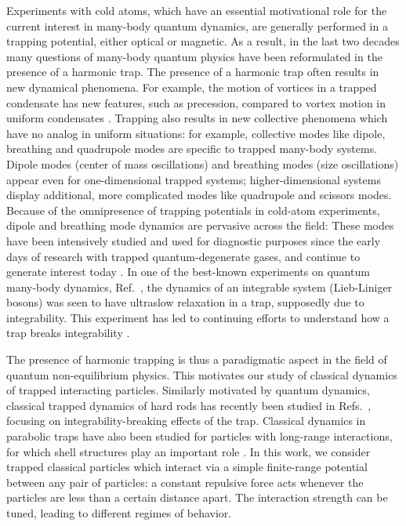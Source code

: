 \documentclass[a4paper, onecolumn]{revtex4-1}
\begin{document}
Experiments with cold atoms, which have an essential motivational role for the current interest in
many-body quantum dynamics, are generally performed in a trapping potential, either optical or
magnetic.  As a result, in the last two decades many questions of many-body quantum physics have
been reformulated in the presence of a harmonic trap.  The presence of a harmonic trap often results
in new dynamical phenomena.  For example, the motion of vortices in a trapped condensate
\cite{vortices_trappedBEC} has new features, such as precession, compared to vortex motion in
uniform condensates \cite{vortices_uniformBEC}.  Trapping also results in new collective phenomena
which have no analog in uniform situations: for example, collective modes like dipole, breathing and
quadrupole modes are specific to trapped many-body systems.  Dipole modes (center of mass
oscillations) and breathing modes (size oscillations) appear even for one-dimensional trapped
systems; higher-dimensional systems display additional, more complicated modes like quadrupole and
scissors modes.  Because of the omnipresence of trapping potentials in cold-atom experiments, dipole
and breathing mode dynamics are pervasive across the field: These modes have been intensively
studied and used for diagnostic purposes since the early days of research with trapped
quantum-degenerate gases, and continue to generate interest today
\cite{collective_modes_early_papers, PitaevskiiRosch_PRA97, Esslinger_exp_PRL2003, STG_Astrakharchik_PRL2005, 
  GrimmSmith_unitaryfermions_PRA08, OrignacCitro_PRA08, Naegerl_Science09, Wetterich_JPB2011, Mazets_1Dbreathing_EPJD11,
  fermion2Dbreathing, Tschischik_BHbreathing_PRA_2013, KroenkeSchmelcher_BM, Bouchoule_PRL2014,
  br_mode_long_range_interactions, Bonitz_Review, QuinnHaque_PRA14, Tschischik_BH_2papers,
   1D_breathing_mode_recent, Minguzzi_dipole_PRA2015, 
  Stringari_lowDcollective_PRA15,    MistakidisSchmelcher_PRA17}. 
%
In one of the best-known experiments on quantum many-body dynamics,
Ref.~\cite{NewtonsCradle_Nature06}, the dynamics of an integrable system (Lieb-Liniger bosons) was
seen to have ultraslow relaxation in a trap, supposedly due to integrability.  This experiment has
led to continuing efforts to understand how a trap breaks integrability
\cite{CauxKonik_glimmers_PRX15, CauxDoyonDubailKonik_1711, DoyonSpohn_JSTAT17, Moore_arXiv17.10}.

The presence of harmonic trapping is thus a paradigmatic aspect in the field of quantum
non-equilibrium physics.  This motivates our study of classical dynamics of trapped interacting
particles.  Similarly motivated by quantum dynamics, classical trapped dynamics of hard rods has
recently been studied in Refs.\ \cite{DoyonSpohn_JSTAT17, Moore_arXiv17.10}, focusing on
integrability-breaking effects of the trap.  Classical dynamics in parabolic traps have also been
studied for particles with long-range interactions, for which shell structures play an important
role \cite{Peeters_shell}.  
%
In this work, we consider trapped classical particles which interact via a simple finite-range
potential between any pair of particles: a constant repulsive force acts whenever the particles are
less than a certain distance apart.  The interaction strength can be tuned, leading to different
regimes of behavior.
\end{document}

